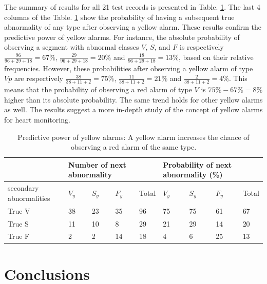 The summary of results for all 21 test records is presented in Table. \ref{table:pred}. The last 4 columns of the Table. \ref{table:pred} show the probability of having a subsequent true abnormality of any type after observing a yellow alarm. %
These results confirm the predictive power of yellow alarms. 
For instance, the absolute probability of observing a segment with abnormal classes $V$, $S$, and $F$ is respectively $\frac{96}{96+29+18}=67\%$, $\frac{29}{96+29+18}=20\%$ and $\frac{18}{96+29+18}=13\%$, based on their relative frequencies. However, these probabilities after observing a yellow alarm of type $Vp$ are respectively $\frac{38}{38+11+2}=75\%$, $\frac{11}{38+11+2}=21\%$ and $\frac{2}{38+11+2}=4\%$. This means that the probability of observing a red alarm of type $V$ is $75\%-67\%=8\%$ higher than its absolute probability. The same trend holds for other yellow alarms as well. The results suggest a more in-depth study of the concept of yellow alarms for heart monitoring.

\begin{table}
	\caption{Predictive power of yellow alarms: A yellow alarm increases the chance of observing a red alarm of the same type.}
	\centering
	\begin{tabular}{|m{3.5em}|| m{1.4em} || m{1.4em} || m{1.4em} ||m{1.4em}|| m{1.4em} || m{1.4em} || m{1.4em} || m{1.4em}|}
		\hline
		& \multicolumn{3}{m{8em}}{Number of next abnormality }& &\multicolumn{3}{m{8em}}{Probability of next abnormality (\%)}  & \\ 
		\hline 
		secondary abnormalities & $V_y$ & $S_y$ & $F_y$ & Total & $V_y$ & $S_y$ & $F_y$ & Total \\ 
		\hline 
		True V & 38 & 23 & 35& 96 & 75 & 75 & 61 & 67 \\ 
		\hline 
		True S & 11 & 10 & 8 & 29 & 21 & 29 & 14& 20 \\ 
		\hline 
		True F & 2 & 2 & 14 & 18 & 4 & 6 & 25 & 13 \\ 
		\hline 
	\end{tabular} 
	\label{table:pred}
\end{table}


\section{Conclusions}

